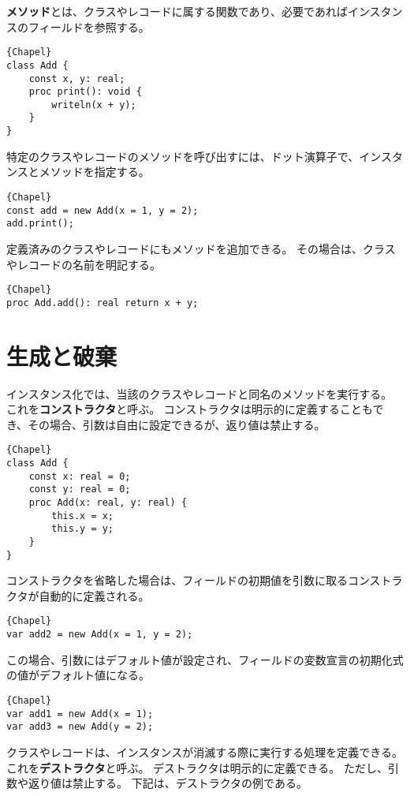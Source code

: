 \documentclass[10pt,a4paper]{book}
\begin{document}
\textbf{メソッド}とは、クラスやレコードに属する関数であり、必要であればインスタンスのフィールドを参照する。

\begin{Verbatim}{Chapel}
class Add {
	const x, y: real;
	proc print(): void {
		writeln(x + y);
	}
}
\end{Verbatim}

特定のクラスやレコードのメソッドを呼び出すには、ドット演算子で、インスタンスとメソッドを指定する。

\begin{Verbatim}{Chapel}
const add = new Add(x = 1, y = 2);
add.print();
\end{Verbatim}

定義済みのクラスやレコードにもメソッドを追加できる。
その場合は、クラスやレコードの名前を明記する。

\begin{Verbatim}{Chapel}
proc Add.add(): real return x + y;
\end{Verbatim}

\section{生成と破棄}

インスタンス化では、当該のクラスやレコードと同名のメソッドを実行する。
これを\textbf{コンストラクタ}と呼ぶ。
コンストラクタは明示的に定義することもでき、その場合、引数は自由に設定できるが、返り値は禁止する。

\begin{Verbatim}{Chapel}
class Add {
	const x: real = 0;
	const y: real = 0;
	proc Add(x: real, y: real) {
		this.x = x;
		this.y = y;
	}
}
\end{Verbatim}

コンストラクタを省略した場合は、フィールドの初期値を引数に取るコンストラクタが自動的に定義される。

\begin{Verbatim}{Chapel}
var add2 = new Add(x = 1, y = 2);
\end{Verbatim}

この場合、引数にはデフォルト値が設定され、フィールドの変数宣言の初期化式の値がデフォルト値になる。

\begin{Verbatim}{Chapel}
var add1 = new Add(x = 1);
var add3 = new Add(y = 2);
\end{Verbatim}

クラスやレコードは、インスタンスが消滅する際に実行する処理を定義できる。
これを\textbf{デストラクタ}と呼ぶ。
デストラクタは明示的に定義できる。
ただし、引数や返り値は禁止する。
下記は、デストラクタの例である。
\end{document}
